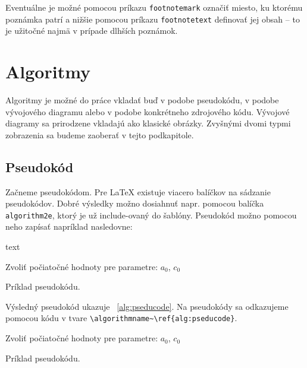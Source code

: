 Eventuálne je možné pomocou príkazu \texttt{footnotemark} označiť miesto, ku ktorému poznámka patrí a nižšie pomocou príkazu \texttt{footnotetext} definovať jej obsah -- to je užitočné najmä v prípade dlhších poznámok.

\section{Algoritmy}

Algoritmy je možné do práce vkladať buď v podobe pseudokódu, v podobe vývojového diagramu alebo v podobe konkrétneho zdrojového kódu. Vývojové diagramy sa prirodzene vkladajú ako klasické obrázky. Zvyšnými dvomi typmi zobrazenia sa budeme zaoberať v tejto podkapitole.

\subsection{Pseudokód}

Začneme pseudokódom. Pre LaTeX existuje viacero balíčkov na sádzanie pseudokódov. Dobré výsledky možno dosiahnuť napr. pomocou balíčka \texttt{algorithm2e}, ktorý je už include-ovaný do šablóny. Pseudokód možno pomocou neho zapísať napríklad nasledovne:
\begin{inlinecode}{text}
\begin{algorithm}
Zvoliť počiatočné hodnoty pre parametre: $a_0$, $c_0$\;
\caption{Príklad pseudokódu.}
\label{alg:graddesc_iterative}
\end{algorithm}
\end{inlinecode}
Výsledný pseudokód ukazuje \algorithmname~\ref{alg:pseducode}. Na pseudokódy sa odkazujeme pomocou kódu v tvare \texttt{{\textbackslash}algorithmname\textasciitilde{\textbackslash}ref\{alg:pseducode\}}.

\begin{algorithm}
Zvoliť počiatočné hodnoty pre parametre: $a_0$, $c_0$\;
\caption{Príklad pseudokódu.}
\label{alg:pseducode}
\end{algorithm}


